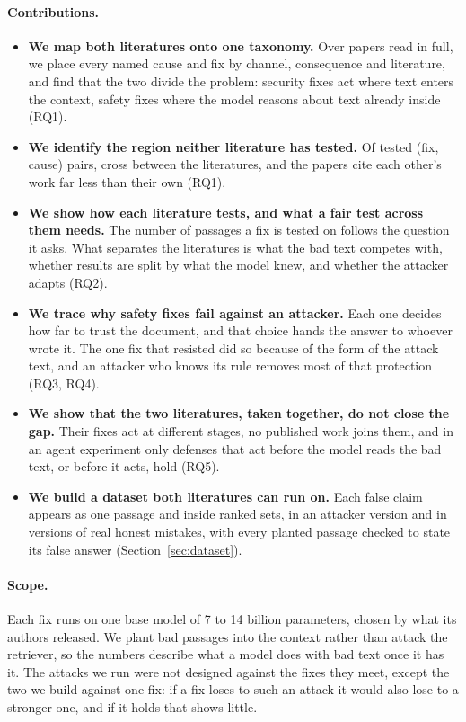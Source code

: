 \paragraph{Contributions.}
\begin{itemize}
\item \textbf{We map both literatures onto one taxonomy.} Over \NCorpus{}
  papers read in full, we place every named cause and fix by channel,
  consequence and literature, and find that the two divide the problem:
  security fixes act where text enters the context, safety fixes where the
  model reasons about text already inside (RQ1).

\item \textbf{We identify the region neither literature has tested.} Of
  \NPureRegimePairs{} tested (fix, cause) pairs, \NCrossCommunityPairs{}
  cross between the literatures, and the papers cite each other's work far
  less than their own (RQ1).

\item \textbf{We show how each literature tests, and what a fair test across
  them needs.} The number of passages a fix is tested on follows the question
  it asks. What separates the literatures is what the bad text competes with,
  whether results are split by what the model knew, and whether the attacker
  adapts (RQ2).

\item \textbf{We trace why safety fixes fail against an attacker.} Each one
  decides how far to trust the document, and that choice hands the answer to
  whoever wrote it. The one fix that resisted did so because of the form of
  the attack text, and an attacker who knows its rule removes most of that
  protection (RQ3, RQ4).

\item \textbf{We show that the two literatures, taken together, do not close
  the gap.} Their fixes act at different stages, no published work joins
  them, and in an agent experiment only defenses that act before the model
  reads the bad text, or before it acts, hold (RQ5).

\item \textbf{We build a dataset both literatures can run on.} Each false
  claim appears as one passage and inside ranked sets, in an attacker version
  and in versions of real honest mistakes, with every planted passage checked
  to state its false answer (Section~\ref{sec:dataset}).
\end{itemize}

\paragraph{Scope.}
Each fix runs on one base model of 7 to 14 billion parameters, chosen by what
its authors released. We plant bad passages into the context rather than
attack the retriever, so the numbers describe what a model does with bad text
once it has it. The attacks we run were not designed against the fixes they
meet, except the two we build against one fix: if a fix loses to such an
attack it would also lose to a stronger one, and if it holds that shows
little.

